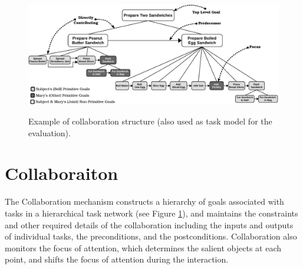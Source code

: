\documentclass{aamas2016_extendedabstract}
\begin{document}
\begin{figure}
  \centering
  \vspace*{-5mm}
  \includegraphics[width=14.5cm,height=5.225cm]{figure/taskModel-croped.pdf}
  \vspace*{-3mm}
  \caption{Example of collaboration structure (also used as task model for
  the evaluation).}
  \label{fig:taskModel}
  \vspace*{-5mm}
\end{figure}


\section{Collaboraiton}

The Collaboration mechanism constructs a hierarchy of goals associated with
tasks in a hierarchical task network (see Figure \ref{fig:taskModel}), and
maintains the constraints and other required details of the collaboration
including the inputs and outputs of individual tasks, the preconditions, and the
postconditions. Collaboration also monitors the focus of attention, which
determines the salient objects at each point, and shifts the focus of attention
during the interaction.
\end{document}
